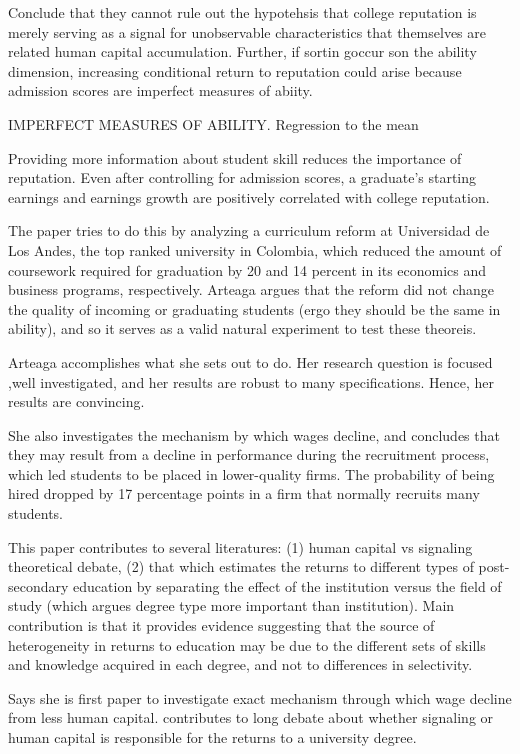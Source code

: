 \documentclass[a4paper, 11pt]{article}
\begin{document}
 
 Conclude that they cannot rule out the hypotehsis that college reputation is merely serving as a signal for unobservable characteristics that themselves are related human capital accumulation.  Further, if sortin goccur son the ability dimension, increasing conditional return to reputation could arise because admission scores are imperfect measures of abiity. 
 
IMPERFECT MEASURES OF ABILITY. Regression to the mean
 
Providing more information about student skill reduces the importance of reputation.  Even after controlling for admission scores, a graduate's starting earnings and earnings growth are positively correlated with college reputation. 

The paper tries to do this by analyzing a curriculum reform at Universidad de Los Andes, the top ranked university in Colombia, which reduced the amount of coursework required for graduation by 20 and 14 percent in its economics and business programs, respectively.   Arteaga argues that the reform did not change the quality of incoming or graduating students (ergo they should be the same in ability), and so it serves as a valid natural experiment to test these theoreis.

Arteaga accomplishes what she sets out to do. Her research question is focused ,well investigated, and her results are robust to many specifications.  Hence, her results are convincing.

  She also investigates the mechanism by which wages decline, and concludes that they may result from a decline in performance during the recruitment process, which led students to be placed in lower-quality firms.  The probability of being hired dropped by 17 percentage points in a firm that normally recruits many students.



This paper contributes to several literatures: (1) human capital vs signaling theoretical debate, (2) that which estimates the returns to different types of post-secondary education by separating the effect of the institution versus the field of study (which argues degree type more important than institution). Main contribution is that it provides evidence suggesting that the source of heterogeneity in returns to education may be due to the different sets of skills and knowledge acquired in each degree, and not to differences in selectivity.

Says she is first paper to investigate exact mechanism through which wage decline from less human capital.   contributes to long debate about whether signaling or human capital is responsible for the returns to a university degree. 
\end{document}
